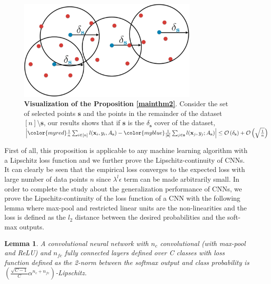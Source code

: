 \documentclass{article} %
\newtheorem{lemma}{Lemma}
\begin{document}
\begin{figure}[ht]
    \begin{center} \includegraphics[width=0.8\textwidth]{thm.pdf} \end{center} 
        \caption{\textbf{Visualization of the Proposition \ref{mainthm2}}. Consider the set of selected points
        {\color{myblue} $\mathbf{s}$} and the points in the remainder of the dataset {\color{myred} $[n] \setminus
        \mathbf{s}$}, our results shows that if $\mathbf{s}$ is the $\delta_{\mathbf{s}}$ cover of the dataset, 
        $\left| {\color{myred} \frac{1}{n}\sum_{i \in [n]} l(\mathbf{x}_i,y_i,A_{\mathbf{s}})} -{\color{myblue} \frac{1}{|\mathbf{s}|}\sum_{j \in
        \mathbf{s}} l(\mathbf{x}_j,y_j;A_{\mathbf{s}})}
    \right| \leq \mathcal{O}\left(\delta_\mathbf{s}\right) + \mathcal{O}\left(\sqrt{\frac{1}{n}}\right)$}
    \label{fig:thm}
    \end{figure}

First of all, this proposition is applicable to any machine learning algorithm with a Lipschitz loss function and we
further prove the Lipschitz-continuity of CNNs. It can clearly be seen that the empirical loss converges to the expected
loss with large number of data points $n$ since $\lambda^l\epsilon$ term can be made arbitrarily small. In order to
complete the study about the generalization performance of CNNs, we prove the Lipschitz-continuity of the loss function
of a CNN with the following lemma where max-pool and restricted linear units are the non-linearities and the loss is
defined as the $l_2$ distance between the desired probabilities and the soft-max outputs.

\begin{lemma} A convolutional neural network with $n_c$ convolutional (with max-pool and ReLU) and $n_{fc}$ fully
connected layers defined over C classes with loss function defined as the 2-norm between the softmax output and class
probability is $\left(\frac{\sqrt{C-1}}{C} \alpha^{n_c+n_{fc}}\right)$-Lipschitz. \end{lemma}
\end{document}
